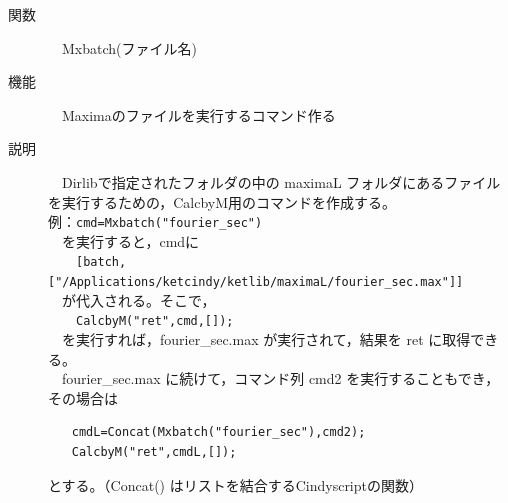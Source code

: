 \documentclass[papersize,a4paper,12pt,uplatex]{jsarticle}
\begin{document}
\begin{description}
\hypertarget{mxbatch}{}
\item[関数]　Mxbatch(ファイル名)
\item[機能]　Maximaのファイルを実行するコマンド作る
\item[説明]　Dirlibで指定されたフォルダの中の maximaL フォルダにあるファイルを実行するための，CalcbyM用のコマンドを作成する。\\
例：\verb|cmd=Mxbatch("fourier_sec")|\\
　を実行すると，cmdに\\
　　\verb|[batch,["/Applications/ketcindy/ketlib/maximaL/fourier_sec.max"]] |\\
　が代入される。そこで，\\
　　\verb|CalcbyM("ret",cmd,[]);|\\
　を実行すれば，fourier\_sec.max が実行されて，結果を ret に取得できる。\\
　fourier\_sec.max に続けて，コマンド列 cmd2 を実行することもでき，その場合は
\begin{verbatim}
　　cmdL=Concat(Mxbatch("fourier_sec"),cmd2);
　　CalcbyM("ret",cmdL,[]);
\end{verbatim}
とする。（Concat() はリストを結合するCindyscriptの関数）\\
　\\


\end{description}
\end{document}
